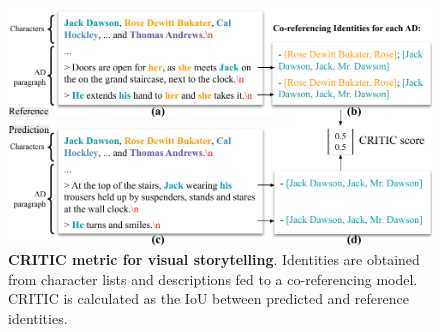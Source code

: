 \begin{figure}[t!]
    \centering
    \includegraphics[width=\linewidth]{figs/CRITIC2.pdf}
    \caption{\textbf{CRITIC metric for visual storytelling}. Identities are obtained from character lists and descriptions fed to a co-referencing model. CRITIC \citep{han2024autoadiii} is calculated as the IoU between predicted and reference identities. }
    \label{fig:CRITIC}
\end{figure}


